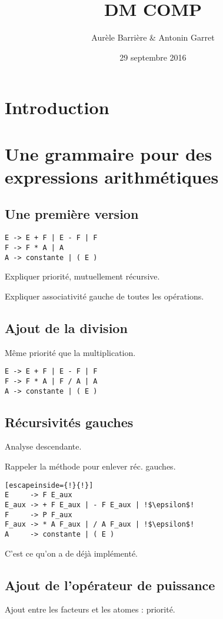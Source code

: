 \documentclass[12pt]{article}
\title{DM COMP}
\author{Aurèle Barrière \& Antonin Garret}
\date{29 septembre 2016}
\begin{document}
\maketitle

\section{Introduction}


\section{Une grammaire pour des expressions arithmétiques}
\subsection{Une première version}
\begin{lstlisting}
E -> E + F | E - F | F
F -> F * A | A
A -> constante | ( E )
\end{lstlisting}
Expliquer priorité, mutuellement récursive.

Expliquer associativité gauche de toutes les opérations.

\subsection{Ajout de la division}
Même priorité que la multiplication.
\begin{lstlisting}
E -> E + F | E - F | F
F -> F * A | F / A | A
A -> constante | ( E )
\end{lstlisting}

\subsection{Récursivités gauches}
Analyse descendante.

Rappeler la méthode pour enlever réc. gauches.

\begin{lstlisting}[escapeinside={!}{!}]
E     -> F E_aux
E_aux -> + F E_aux | - F E_aux | !$\epsilon$!
F     -> P F_aux
F_aux -> * A F_aux | / A F_aux | !$\epsilon$!
A     -> constante | ( E )
\end{lstlisting}
C'est ce qu'on a de déjà implémenté.

\subsection{Ajout de l'opérateur de puissance}
Ajout entre les facteurs et les atomes : priorité.
\end{document}
